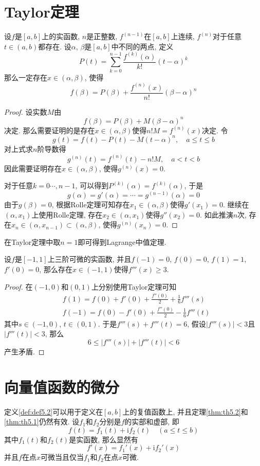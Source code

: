 \documentclass[cn,12pt,math=mtpro2,citestyle=gb7714-2015,bibstyle=gb7714-2015,twocol]{elegantbook}
\begin{document}
\section{Taylor定理}
\begin{theorem}
  设$f$是$[a,b]$上的实函数, $n$是正整数, $f^{(n-1)}$在$[a,b]$上连续, $f^{(n)}$对于任意$t\in(a,b)$都存在. 设$\alpha$, $\beta$是$[a,b]$中不同的两点, 定义
  $$P(t)=\sum_{k=0}^{n-1}\frac{f^{(k)}(\alpha)}{k!}(t-\alpha)^k$$
  那么一定存在$x\in(\alpha,\beta)$, 使得
  $$f(\beta)=P(\beta)+\frac{f^{(n)}(x)}{n!}(\beta-\alpha)^n$$
\end{theorem}
\begin{proof}
  设实数$M$由
  $$f(\beta)=P(\beta)+M(\beta-\alpha)^n$$
  决定. 那么需要证明的是存在$x\in(\alpha,\beta)$使得$n! M=f^{(n)}(x)$决定. 令
  $$g(t)=f(t)-P(t)-M(t-\alpha)^n,\quad a\leq t\leq b$$
  对上式求$n$阶导数得
  $$g^{(n)}(t)=f^{(n)}(t)-n!M,\quad a<t<b$$
  因此需要证明存在$x\in(\alpha,\beta)$, 使得$g^{(n)}(x)=0$.

  对于任意$k=0\cdots,n-1$, 可以得到$P^{(k)}(\alpha)=f^{(k)}(\alpha)$, 于是
  $$g(\alpha)=g'(\alpha)=\cdots=g^{(n-1)}(\alpha)=0$$
  由于$g(\beta)=0$, 根据Rolle定理可知存在$x_1\in (\alpha,\beta)$使得$g'(x_1)=0$. 继续在$(\alpha,x_1)$上使用Rolle定理, 存在$x_2\in(\alpha,x_1)$使得$g''(x_2)=0$. 如此推演$n$次, 存在$x_n\in (\alpha,x_{n-1})\subset(\alpha,\beta)$, 使得$g^{(n)}(x_n)=0$.
\end{proof}
\begin{remark}
在Taylor定理中取$n=1$即可得到Lagrange中值定理.
\end{remark}

\begin{example}
设$f$是$[-1,1]$上三阶可微的实函数, 并且$f(-1)=0$, $f(0)=0$, $f(1)=1$, $f'(0)=0$, 那么存在$x\in(-1,1)$使得$f'''(x)\geq3$.
\end{example}
\begin{proof}
  在$(-1,0)$和$(0,1)$上分别使用Taylor定理可知
  \begin{align*}
  &f(1)=f(0)+f'(0)+\frac{f''(0)}{2}+\frac{1}{6}f'''(s)\\
  &f(-1)=f(0)-f'(0)+\frac{f''(0)}{2}-\frac{1}{6}f'''(t)
  \end{align*}
  其中$s\in(-1,0)$, $t\in(0,1)$. 于是$f'''(s)+f'''(t)=6$, 假设$|f'''(s)|<3$且$|f'''(t)|<3$, 那么
  $$6\leq|f'''(s)|+|f'''(t)|<6$$
  产生矛盾.
\end{proof}

\section{向量值函数的微分}
定义\ref{def:def5.2}可以用于定义在$[a,b]$上的复值函数上, 并且定理\ref{thm:th5.2}和\ref{thm:th5.1}仍然有效. 设$f_1$和$f_2$分别是$f$的实部和虚部, 即
$$f(t)=f_1(t)+\text{i}f_2(t)\quad(a\leq t\leq b)$$
其中$f_1(t)$和$f_2(t)$是实函数, 那么显然有
$$f'(x)=f_1'(x)+\text{i}f_2'(x)$$
并且$f$在点$x$可微当且仅当$f_1$和$f_2$在点$x$可微.
\end{document}
